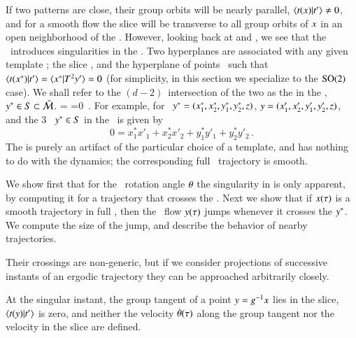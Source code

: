 

If  two patterns are close, their group orbits will be nearly parallel,
$\braket{\groupTan(\ssp)}{\sliceTan{}} \neq 0$, and for a smooth flow the
slice will be transverse to all group orbits of $x$ in an open
neighborhood of the {\template} \slicep. However, looking back at
 and , we see that the
\mslices\ introduces singularities in the \reducedsp. Two hyperplanes are
associated with  any given template \slicep; the slice ,
and the hyperplane of points \sspSing\ such that
\( %
\braket{\groupTan(\sspSing)}{\sliceTan{}}
 =
\braket{\sspSing}{\Lg^2\slicep}
 =0
\) %
(for simplicity, in this section we specialize to the  $\textrm{SO}(2)$ case).
We shall refer to the $(d\!-\!2)$\dmn\ intersection of the two as
the {\em \sset} in the \reducedsp, $y^* \in S \subset \bar{\cal M}$.
\beq
\braket{\groupTan(\sspRSing)}{\sliceTan{}}
 =
\braket{\sspRSing}{\Lg^2\slicep}
 =0
\,.
For example, for \cLe\
$\sspRSing = (x_1^*,x_2^*,y_1^*,y_2^*,z)$,
$\sspRed = (x_1',x_2',y_1',y_2',z)$,
and the 3\dmn\ {\sset} $\sspRSing \in S$ in the \reducedsp\ is given by
\[
0 = {x_1^* x'_1+x_2^* x'_2+y_1^* y'_1+y_2^* y'_2}
\,.
\]
The {\sset} is purely an artifact of the particular choice of a
template, and has nothing to do with the dynamics; the corresponding full
\statesp\ trajectory is smooth.

We show first that for the \mframes\ rotation angle ${\bf \theta}$ the
singularity in \refeq{SL:CLEsliceRot} is only apparent, by computing it
for a trajectory that crosses the {\sset}. Next we show that if
$x(\tau)$ is a smooth trajectory in full {\statesp}, then the
\reducedsp\ flow $y(\tau)$ jumps whenever it crosses the {\sset}
$y^*$. We compute the size of the jump, and describe the behavior of nearby
trajectories.


Their crossings are
non-generic, but if we consider projections of successive instants of an
ergodic trajectory they can be approached arbitrarily closely.

At the
singular instant, the group tangent of a point $y=g^{-1} x$
lies in the slice, $\braket{\groupTan(\sspRed)}{\sliceTan{}}$ is zero,
and neither the velocity $\dot{{\bf \theta}}(\tau)$ along the group tangent
nor the velocity in the slice are defined.

